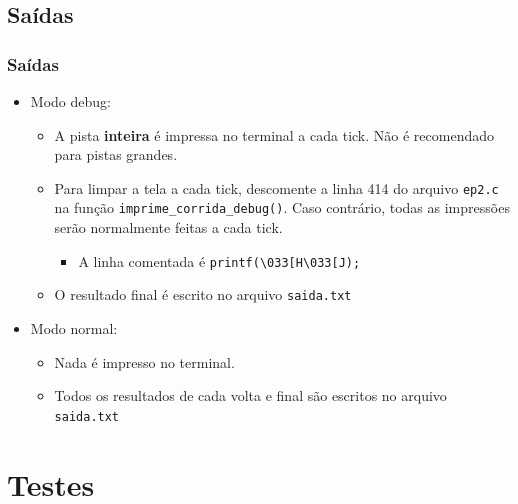 \documentclass{beamer}
\begin{document}
\subsection{Saídas}
\begin{frame}
  \frametitle{Saídas}
  \begin{itemize}
    \item Modo debug:
    \begin{itemize}
      \item A pista \textbf{inteira} é impressa no terminal a cada tick. Não é recomendado para pistas grandes.
      \item Para limpar a tela a cada tick, descomente a linha 414 do arquivo \texttt{ep2.c} na função \texttt{imprime\_corrida\_debug()}. Caso contrário, todas as impressões serão normalmente feitas a cada tick.
      \begin{itemize}
        \item A linha comentada é \texttt{printf(\textbackslash033[H\textbackslash033[J);}
      \end{itemize}
      \item O resultado final é escrito no arquivo \texttt{saida.txt}
    \end{itemize}
    \item Modo normal:
    \begin{itemize}
      \item Nada é impresso no terminal.
      \item Todos os resultados de cada volta e final são escritos no arquivo \texttt{saida.txt}
    \end{itemize}
  \end{itemize}
\end{frame}

\section{Testes}
\end{document}
